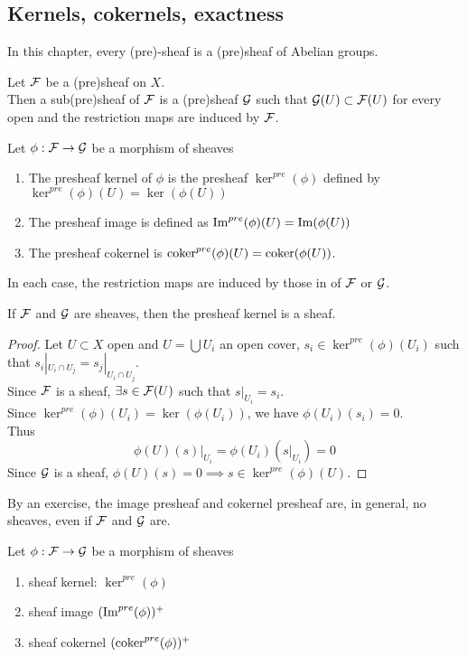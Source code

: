 \documentclass[../main.tex]{subfiles}
\begin{document}
\subsection{Kernels, cokernels, exactness}
In this chapter, every (pre)-sheaf is a (pre)sheaf of Abelian groups.\\
\begin{defn}[Subsheaf]
	Let $\mathcal{F}$ be a (pre)sheaf on $X$.\\
	Then a sub(pre)sheaf of $\mathcal{F}$ is a (pre)sheaf $\mathcal{G}$ such that $\mathcal{G}( U) \subset \mathcal{F}( U) $ for every open and the restriction maps are induced by $\mathcal{F}$.
\end{defn}
\begin{defn}
Let $\phi:\mathcal{F}\to \mathcal{G}$ be a morphism of sheaves
\begin{enumerate}
\item The presheaf kernel of $\phi$ is the presheaf $\ker^{pre}( \phi) $ defined by $\ker^{pre}( \phi) ( U)= \ker( \phi( U) )  $ 
\item The presheaf image is defined as $\operatorname{Im}^{pre}( \phi) ( U) = \operatorname{Im} ( \phi( U) ) $ 
\item The presheaf cokernel is $\operatorname{coker}^{pre}( \phi) ( U) = \operatorname{coker}( \phi( U) ) $.
\end{enumerate}
In each case, the restriction maps are induced by those in of $\mathcal{F}$ or $\mathcal{G}$.

\end{defn}
\begin{lemma}
If $\mathcal{F}$ and $\mathcal{G}$ are sheaves, then the presheaf kernel is a sheaf.
\end{lemma}
\begin{proof}
Let $U \subset X$ open and $U = \bigcup U_i$ an open cover, $s_i \in \ker^{pre}( \phi)( U_i)  $ such that $s_i|_{U_i\cap U_j }= s_j |_{U_i\cap U_j}  $.\\
Since $\mathcal{F}$ is a sheaf, $\exists s \in \mathcal{F}( U) $ such that $s|_{U_i} = s_i$.\\
Since $\ker^{pre}( \phi) ( U_i) = \ker( \phi( U_i) ) $, we have $\phi( U_i) ( s_i) =0$.\\
Thus
\[ 
\phi( U) ( s) |_{U_i} = \phi( U_i) ( s|_{U_i} ) = 0
\]
Since $\mathcal{G}$ is a sheaf, $\phi( U) ( s) =0 \implies s \in \ker^{pre}( \phi) ( U) $.
\end{proof}
\begin{exemple}
By an exercise, the image presheaf and cokernel presheaf are, in general, no sheaves, even if $\mathcal{F}$ and $\mathcal{G}$ are.
\end{exemple}
\begin{defn}
	Let $\phi:\mathcal{F}\to \mathcal{G}$ be a morphism of sheaves
	\begin{enumerate}
	\item sheaf kernel: $\ker^{pre}( \phi) $ 
	\item sheaf image $( \operatorname{Im} ^{pre}( \phi) )^{+}$
	\item sheaf cokernel $( \operatorname{coker} ^{pre}( \phi) )^{+}$
	\end{enumerate}
	
\end{defn}
\end{document}

